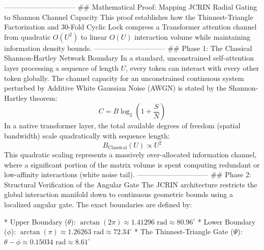 ------------------------------
## Mathematical Proof: Mapping JCRIN Radial Gating to Shannon Channel Capacity
This proof establishes how the Thinnest-Triangle Factorization and 30-Fold Cyclic Lock compress a Transformer attention channel from quadratic $O(U^2)$ to linear $O(U)$ interaction volume while maintaining information density bounds.
------------------------------
## Phase 1: The Classical Shannon-Hartley Network Boundary
In a standard, unconstrained self-attention layer processing a sequence of length $U$, every token can interact with every other token globally. The channel capacity for an unconstrained continuous system perturbed by Additive White Gaussian Noise (AWGN) is stated by the Shannon-Hartley theorem:
$$C = B \log_2 \left( 1 + \frac{S}{N} \right)$$ 
In a native transformer layer, the total available degrees of freedom (spatial bandwidth) scale quadratically with sequence length:
$$B_{\text{Classical}}(U) \propto U^2$$ 
This quadratic scaling represents a massively over-allocated information channel, where a significant portion of the matrix volume is spent computing redundant or low-affinity interactions (white noise tail).
------------------------------
## Phase 2: Structural Verification of the Angular Gate
The JCRIN architecture restricts the global interaction manifold down to continuous geometric bounds using a localized angular gate. The exact boundaries are defined by:

* Upper Boundary ($\theta$): $\arctan(2\pi) \approx 1.41296\text{ rad} \approx 80.96^\circ$
* Lower Boundary ($\phi$): $\arctan(\pi) \approx 1.26263\text{ rad} \approx 72.34^\circ$
* The Thinnest-Triangle Gate ($\Psi$): $\theta - \phi \approx 0.15034\text{ rad} \approx 8.61^\circ$

